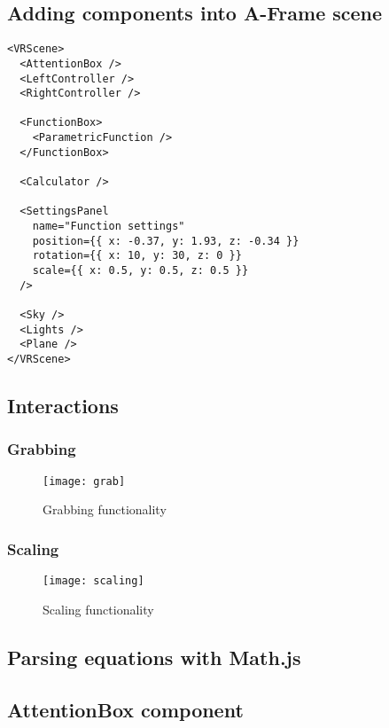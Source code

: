 \subsection{Adding components into A-Frame scene}


\begin{lstlisting}
<VRScene>
  <AttentionBox />
  <LeftController />
  <RightController />

  <FunctionBox>
    <ParametricFunction />
  </FunctionBox>

  <Calculator />

  <SettingsPanel
    name="Function settings"
    position={{ x: -0.37, y: 1.93, z: -0.34 }}
    rotation={{ x: 10, y: 30, z: 0 }}
    scale={{ x: 0.5, y: 0.5, z: 0.5 }}
  />

  <Sky />
  <Lights />
  <Plane />
</VRScene>
\end{lstlisting}

\subsection{Interactions}

\subsubsection{Grabbing}

\begin{figure}[ht!]
\centering
\texttt{[image: grab]}
\caption{Grabbing functionality}
\label{r:5}
\end{figure}

\subsubsection{Scaling}

\begin{figure}[ht!]
\centering
\texttt{[image: scaling]}
\caption{Scaling functionality}
\label{r:6}
\end{figure}

\subsection{Parsing equations with Math.js}


\subsection{AttentionBox component}


